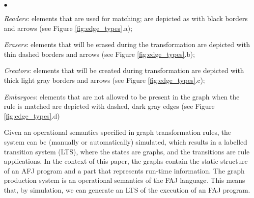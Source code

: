 \begin{list}{$\bullet$}{}
\item \emph{Readers}: elements that are used for matching; are depicted as with black borders and arrows (see Figure \ref{fig:edge_types}.a);
\item \emph{Erasers}: elements that will be erased during the transformation are depicted with thin dashed borders and arrows (see Figure \ref{fig:edge_types}.b);
\item \emph{Creators}: elements that will be created during transformation are depicted with thick light gray borders and arrows (see Figure \ref{fig:edge_types}.c);
\item \emph{Embargoes}: elements that are not allowed to be present in the graph when the rule is matched are depicted with dashed, dark gray edges (see Figure \ref{fig:edge_types}.d)
\end{list}

Given an operational semantics specified in graph transformation rules, the system can be (manually or automatically) simulated, which results in a labelled transition system (LTS), where the states are graphs, and the transitions are rule applications. In the context of this paper, the graphs contain the static structure of an AFJ program and a part that represents run-time information. The graph production system is an operational semantics of the FAJ language. This means that, by simulation, we can generate an LTS of the execution of an FAJ program. 

